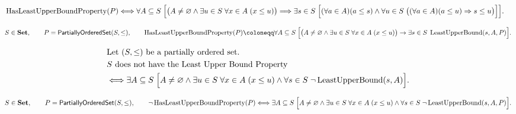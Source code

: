 \begin{remark*}
\[
\begin{aligned}
&\operatorname{HasLeastUpperBoundProperty}(P)
\Longleftrightarrow
\forall A\subseteq S\;
\Bigl[
\bigl(A\neq\varnothing \land \exists u\in S\;\forall x\in A\;(x\le u)\bigr)
\Longrightarrow
\exists s\in S\;
\Bigl[
(\forall a\in A)(a\leq s)
\land
\forall u\in S\;
\bigl((\forall a\in A)(a\leq u)\Rightarrow s\leq u\bigr)
\Bigr]
\Bigr].
\end{aligned}
\]
\end{remark*}

\begin{remark*}
\[
S\in\mathbf{Set},\qquad P=\mathsf{PartiallyOrderedSet}(S,\leq),\qquad
\operatorname{HasLeastUpperBoundProperty}(P)\coloneqq
\forall A\subseteq S\;
\Bigl[
\bigl(A\neq\varnothing \land \exists u\in S\;\forall x\in A\;(x\le u)\bigr)
\rightarrow
\exists s\in S\;\operatorname{LeastUpperBound}(s,A,P)
\Bigr].
\]
\end{remark*}

\begin{remark*}
\[
\begin{aligned}
&\text{Let }(S,\le)\text{ be a partially ordered set}.\\
&S\text{ does not have the Least Upper Bound Property}\\
&\Longleftrightarrow
\exists A\subseteq S\;
\Bigl[
A\neq\varnothing
\land
\exists u\in S\;\forall x\in A\;(x\le u)
\land
\forall s\in S\;\neg\operatorname{LeastUpperBound}(s,A)
\Bigr].
\end{aligned}
\]
\end{remark*}

\begin{remark*}
\[
S\in\mathbf{Set},\qquad P=\mathsf{PartiallyOrderedSet}(S,\leq),\qquad
\neg\operatorname{HasLeastUpperBoundProperty}(P)\Longleftrightarrow
\exists A\subseteq S\;
\Bigl[
A\neq\varnothing
\land
\exists u\in S\;\forall x\in A\;(x\le u)
\land
\forall s\in S\;\neg\operatorname{LeastUpperBound}(s,A,P)
\Bigr].
\]
\end{remark*}

